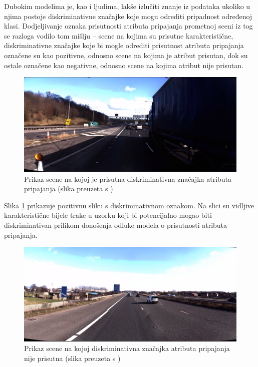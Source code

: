 \documentclass[times, utf8, diplomski, numeric]{fer}
\begin{document}
Dubokim modelima je, kao i ljudima, lakše izlučiti znanje iz podataka ukoliko u njima postoje diskriminativne značajke koje mogu odrediti pripadnost određenoj klasi.
Dodjeljivanje oznaka prisutnosti atributa pripajanja prometnoj sceni iz tog se razloga vodilo tom mišlju -- scene na kojima su prisutne karakteristične, diskriminativne značajke koje bi mogle odrediti prisutnost atributa pripajanja označene su kao pozitivne, odnosno scene na kojima je atribut prisutan, dok su ostale označene kao negativne, odnosno scene na kojima atribut nije prisutan.

\begin{figure}[H]
\centering
\includegraphics[scale=0.15]{images/hand_labeled_positive.png}
\caption{Prikaz scene na kojoj je prisutna diskriminativna značajka atributa pripajanja (slika preuzeta s \citep{url:ftts_irap})}
\label{img:hand_labeled_positive}
\end{figure}

\noindent Slika \ref{img:hand_labeled_positive} prikazuje pozitivnu sliku s diskriminativnom oznakom. 
Na slici su vidljive karakteristične bijele trake u uzorku koji bi potencijalno mogao biti diskriminativan prilikom donošenja odluke modela o prisutnosti atributa pripajanja.

\begin{figure}[H]
\centering
\includegraphics[scale=0.15]{images/hand_labeled_negative.png}
\caption{Prikaz scene na kojoj diskriminativna značajka atributa pripajanja nije prisutna (slika preuzeta s \citep{url:ftts_irap})}
\label{img:hand_labeled_negative}
\end{figure}
\end{document}
